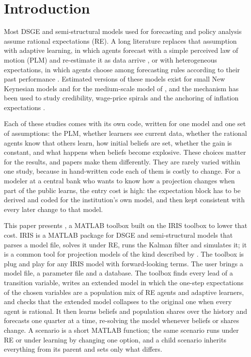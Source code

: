 \documentclass[pdflatex,sn-basic]{sn-jnl}
\DeclareRobustCommand{\code}[1]{\texttt{\detokenize{#1}}}
\begin{document}
\section{Introduction}\label{sec:intro}

Most DSGE and semi-structural models used for forecasting and policy analysis assume rational
expectations (RE). A long literature replaces that assumption with adaptive learning, in which
agents forecast with a simple perceived law of motion (PLM) and re-estimate it as data arrive
\citep{sargent1999,evans2001,evans2009}, or with heterogeneous expectations, in which agents
choose among forecasting rules according to their past performance
\citep{brock1997,branch2009,branch2010,hommes2011,hommes2021}. Estimated versions of these
models exist for small New Keynesian models and for the medium-scale model of \citet{smets2007}
\citep{milani2007,slobodyan2012a,slobodyan2012b,cornea2019,hmoz2023,ozden2025}, and the
mechanism has been used to study credibility, wage-price spirals and the anchoring of inflation
expectations \citep{hommes2019,carvalho2023,koz2024}.

Each of these studies comes with its own code, written for one model and one set of
assumptions: the PLM, whether learners see current data, whether the rational agents know that
others learn, how initial beliefs are set, whether the gain is constant, and what happens when
beliefs become explosive. These choices matter for the results, and papers make them
differently. They are rarely varied within one study, because in hand-written code each of them
is costly to change. For a modeler at a central bank who wants to know how a projection changes
when part of the public learns, the entry cost is high: the expectation block has to be derived
and coded for the institution's own model, and then kept consistent with every later change to
that model.

This paper presents \code{hetlearn}, a MATLAB toolbox built on the IRIS toolbox \citep{iris} to
lower that cost. IRIS is a MATLAB package for DSGE and semi-structural models that parses a model
file, solves it under RE, runs the Kalman filter and simulates it; it is a common tool for
projection models of the kind described by \citet{berg2006}. The
toolbox is plug and play for any IRIS model with forward-looking terms. The user brings a model
file, a parameter file and a database. The toolbox finds every lead of a transition variable,
writes an extended model in which the one-step expectations of the chosen variables are a
population mix of RE agents and adaptive learners, and checks that the extended model collapses
to the original one when every agent is rational. It then learns beliefs and population shares
over the history and forecasts one quarter at a time, re-solving the model whenever beliefs or
shares change. A scenario is a short MATLAB function; the same scenario runs under RE or under
learning by changing one option, and a child scenario inherits everything from its parent and
sets only what differs.
\end{document}
